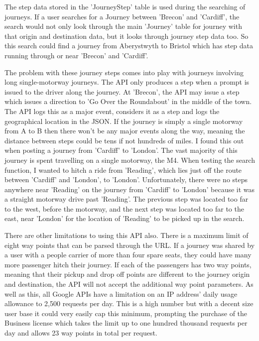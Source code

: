 	The step data stored in the 'Journey\textunderscore Step' table is used during the searching of journeys. If a user searches for a Journey between 'Brecon' and 'Cardiff', the search would not only look through the main 'Journey' table for journey with that origin and destination data, but it looks through journey step data too. So this search could find a journey from Aberystwyth to Bristol which has step data running through or near 'Brecon' and 'Cardiff'. 
	
	The problem with these journey steps comes into play with journeys involving long single-motorway journeys. The API only produces a step when a prompt is issued to the driver along the journey. At 'Brecon', the API may issue a step which issues a direction to 'Go Over the Roundabout' in the middle of the town. The API logs this as a major event, considers it as a step and logs the geographical location in the JSON. If the journey is simply a single motorway from A to B then there won't be any major events along the way, meaning the distance between steps could be tens if not hundreds of miles. I found this out when posting a journey from 'Cardiff' to 'London'. The vast majority of this journey is spent travelling on a single motorway, the M4. When testing the search function, I wanted to hitch a ride from 'Reading', which lies just off the route between 'Cardiff' and 'London', to 'London'. Unfortunately, there were no steps anywhere near 'Reading' on the journey from 'Cardiff' to 'London' because it was a straight motorway drive past 'Reading'. The previous step was located too far to the west, before the motorway, and the next step was located too far to the east, near 'London' for the location of 'Reading' to be picked up in the search.
	
	There are other limitations to using this API also. There is a maximum limit of eight way points that can be parsed through the URL. If a journey was shared by a user with a people carrier of more than four spare seats, they could have many more passenger hitch their journey. If each of the passengers has two way points, meaning that their pickup and drop off points are different to the journey origin and destination, the API will not accept the additional way point parameters. As well as this, all Google APIs have a limitation on an IP address' daily usage allowance to 2,500 requests per day. This is a high number but with a decent size user base it could very easily cap this minimum, prompting the purchase of the Business license\cite{google_api_allowance} which takes the limit up to one hundred thousand requests per day and allows 23 way points in total per request.
	
